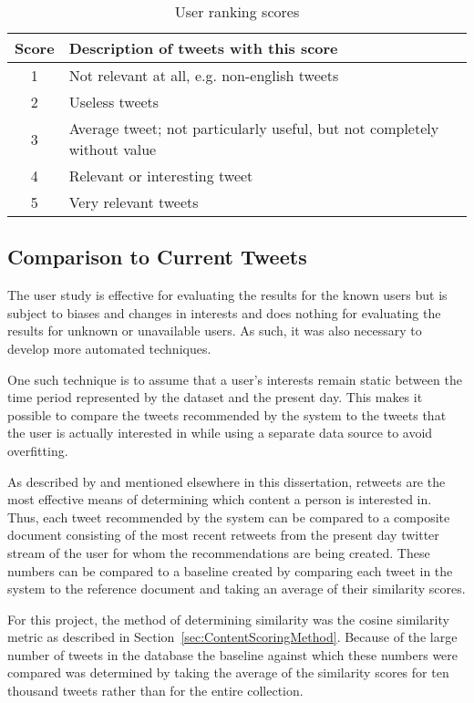 
\begin{table}
\centering
\begin{tabular}{c|l}
{\bf Score} & {\bf Description of tweets with this score} \\ \hline
1 & Not relevant at all, e.g. non-english tweets \\ \hline
2 & Useless tweets \\ \hline
3 & Average tweet; not particularly useful, but not completely without value \\ \hline
4 & Relevant or interesting tweet \\ \hline
5 & Very relevant tweets \\
\end{tabular}
\caption{User ranking scores}
\label{tab:UserRankingScores}
\end{table}


\subsection{Comparison to Current Tweets}

The user study is effective for evaluating the results for the known users but is subject to biases and changes in interests and does nothing for evaluating the results for unknown or unavailable users. As such, it was also necessary to develop more automated techniques.

One such technique is to assume that a user's interests remain static between the time period represented by the dataset and the present day. This makes it possible to compare the tweets recommended by the system to the tweets that the user is actually interested in while using a separate data source to avoid overfitting.

As described by \cite{Welch2011} and mentioned elsewhere in this dissertation, retweets are the most effective means of determining which content a person is interested in. Thus, each tweet recommended by the system can be compared to a composite document consisting of the most recent retweets from the present day twitter stream of the user for whom the recommendations are being created. These numbers can be compared to a baseline created by comparing each tweet in the system to the reference document and taking an average of their similarity scores.

For this project, the method of determining similarity was the cosine similarity metric as described in Section~\ref{sec:ContentScoringMethod}. Because of the large number of tweets in the database the baseline against which these numbers were compared was determined by taking the average of the similarity scores for ten thousand tweets rather than for the entire collection.

